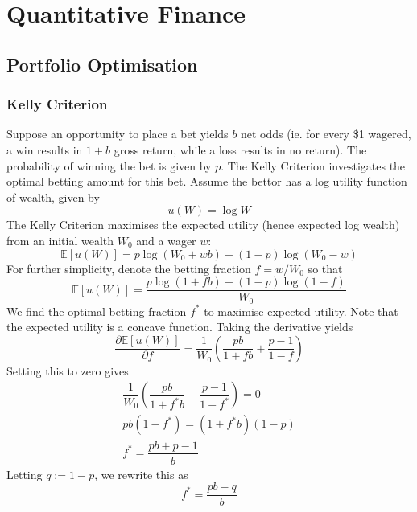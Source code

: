 \documentclass[11pt]{report} %
\begin{document}
\chapter{Quantitative Finance}

\section{Portfolio Optimisation}

\subsection{Kelly Criterion}

Suppose an opportunity to place a bet yields $b$ net odds (ie. for every \$1 wagered, a win results in $1 + b$ gross return, while a loss results in no return). The probability of winning the bet is given by $p$. The Kelly Criterion investigates the optimal betting amount for this bet. Assume the bettor has a log utility function of wealth, given by
\begin{equation}
u\left(W\right) = \log W
\end{equation}
The Kelly Criterion maximises the expected utility (hence expected log wealth) from an initial wealth $W_{0}$ and a wager $w$:
\begin{equation}
\mathbb{E}\left[u\left(W\right)\right] = p\log\left(W_{0} + wb\right) + \left(1 - p\right)\log\left(W_{0} - w\right)
\end{equation}
For further simplicity, denote the betting fraction $f = w/W_{0}$ so that
\begin{equation}
\mathbb{E}\left[u\left(W\right)\right] = \dfrac{p\log\left(1 + fb\right) + \left(1 - p\right)\log\left(1 - f\right)}{W_{0}}
\end{equation}
We find the optimal betting fraction $f^{*}$ to maximise expected utility. Note that the expected utility is a concave function. Taking the derivative yields
\begin{equation}
\dfrac{\partial \mathbb{E}\left[u\left(W\right)\right]}{\partial f} = \dfrac{1}{W_{0}}\left(\dfrac{pb}{1 + fb} + \dfrac{p - 1}{1 - f}\right)
\end{equation}
Setting this to zero gives
\begin{gather}
\dfrac{1}{W_{0}}\left(\dfrac{pb}{1 + f^{*}b} + \dfrac{p - 1}{1 - f^{*}}\right) = 0 \\
pb\left(1 - f^{*}\right) = \left(1 + f^{*}b\right)\left(1 - p\right) \\
f^{*} = \dfrac{pb + p - 1}{b}
\end{gather}
Letting $q := 1 - p$, we rewrite this as
\begin{equation}
f^{*} = \dfrac{pb - q}{b}
\end{equation}
\end{document}
